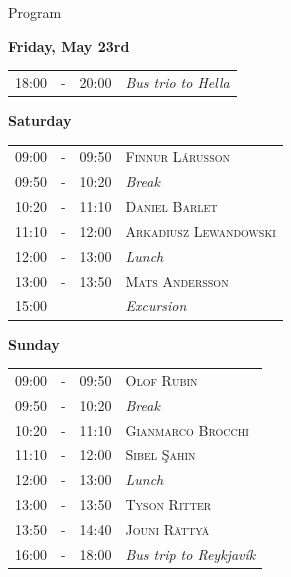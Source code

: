 \documentclass[12pt,openany]{report}      %
\begin{document}
\newpage
\begin{center} 
    \noindent{}
\end{center}
    
\vfill


\pagebreak
\renewcommand{\arraystretch}{1.2}

\noindent
{\LARGE Program}

\bigskip
\bigskip
\noindent
\textbf{\large Friday, May 23rd}
\smallskip

\noindent
\begin{tabular}{l@{\ } l@{\ } l l}
18:00 & - & 20:00 & \textit{Bus trio to Hella}
\end{tabular}

\bigskip
\noindent
\textbf{\large Saturday}
\smallskip

\noindent
\begin{tabular}{l@{ } l@{ } l l}
09:00 & - & 09:50 & \textsc{Finnur Lárusson}
\\
09:50 & - & 10:20 & \textit{Break}
\\
10:20 & - & 11:10 & \textsc{Daniel Barlet}
\\
11:10 & - & 12:00 & \textsc{Arkadiusz Lewandowski}
\\
12:00 & - & 13:00 & \textit{Lunch}
\\
13:00 & - & 13:50 & \textsc{Mats Andersson}
\\
15:00 &  &  & \textit{Excursion}
\end{tabular}

\bigskip
\noindent
\textbf{\large Sunday}
\smallskip

\noindent
\begin{tabular}{l@{ } l@{ } l l}
09:00 & - & 09:50 & \textsc{Olof Rubin}
\\
09:50 & - & 10:20 & \textit{Break}
\\
10:20 & - & 11:10 & \textsc{Gianmarco Brocchi}
\\
11:10 & - & 12:00 & \textsc{Sibel Şahin}
\\
12:00 & - & 13:00 & \textit{Lunch}
\\
13:00 & - & 13:50 & \textsc{Tyson Ritter}
\\
13:50 & - & 14:40 & \textsc{Jouni Rättyä}
\\
16:00 & - & 18:00 & \textit{Bus trip to Reykjavík}
\end{tabular}
\end{document}
